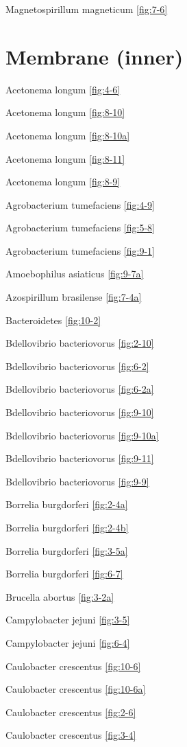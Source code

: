\documentclass[]{tufte-book}
\begin{document}
Magnetospirillum magneticum \ref{fig:7-6}

\section*{Membrane (inner)}\label{membrane-inner}

Acetonema longum \ref{fig:4-6}

Acetonema longum \ref{fig:8-10}

Acetonema longum \ref{fig:8-10a}

Acetonema longum \ref{fig:8-11}

Acetonema longum \ref{fig:8-9}

Agrobacterium tumefaciens \ref{fig:4-9}

Agrobacterium tumefaciens \ref{fig:5-8}

Agrobacterium tumefaciens \ref{fig:9-1}

Amoebophilus asiaticus \ref{fig:9-7a}

Azospirillum brasilense \ref{fig:7-4a}

Bacteroidetes \ref{fig:10-2}

Bdellovibrio bacteriovorus \ref{fig:2-10}

Bdellovibrio bacteriovorus \ref{fig:6-2}

Bdellovibrio bacteriovorus \ref{fig:6-2a}

Bdellovibrio bacteriovorus \ref{fig:9-10}

Bdellovibrio bacteriovorus \ref{fig:9-10a}

Bdellovibrio bacteriovorus \ref{fig:9-11}

Bdellovibrio bacteriovorus \ref{fig:9-9}

Borrelia burgdorferi \ref{fig:2-4a}

Borrelia burgdorferi \ref{fig:2-4b}

Borrelia burgdorferi \ref{fig:3-5a}

Borrelia burgdorferi \ref{fig:6-7}

Brucella abortus \ref{fig:3-2a}

Campylobacter jejuni \ref{fig:3-5}

Campylobacter jejuni \ref{fig:6-4}

Caulobacter crescentus \ref{fig:10-6}

Caulobacter crescentus \ref{fig:10-6a}

Caulobacter crescentus \ref{fig:2-6}

Caulobacter crescentus \ref{fig:3-4}
\end{document}
